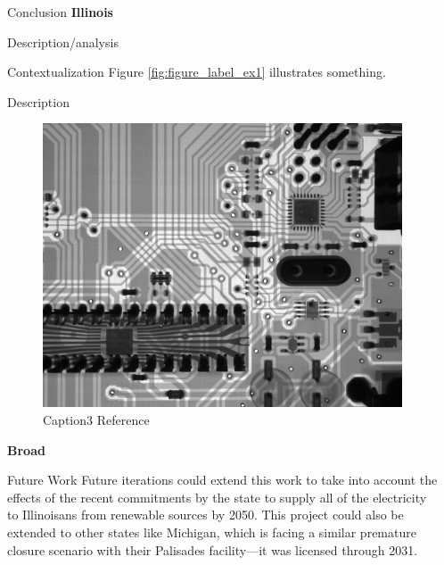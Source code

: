 \documentclass[final]{beamer}
\newlength{\sepwid}
\newlength{\onecolwid}
\newlength{\threecolwid}
\begin{document}
\begin{frame}[t]
\begin{columns}[t,totalwidth=\threecolwid]
\begin{column}{\sepwid}\end{column} %

\begin{column}{\onecolwid} %

\begin{block}{Conclusion}
\textbf{Illinois}
\vspace{0.7em}

Description/analysis
 
Contextualization
Figure \ref{fig:figure_label_ex1} illustrates something.

Description

\begin{figure}
	\label{fig:figure_label_ex3}
	\includegraphics[width=0.9\linewidth]{graphic_name3}
	\caption{Caption3 Reference \cite{call_tag_article}}
\end{figure}

\vspace{0.7em}
\textbf{Broad}
\vspace{0.7em}



\end{block}

\begin{alertblock}{Future Work }
	Future iterations could extend this work to take into account the effects of the recent commitments by the state to supply all of the electricity to Illinoisans from renewable sources by 2050.
	This project could also be extended to other states like Michigan, which is facing a similar premature closure scenario with their Palisades facility---it was licensed through 2031.


\end{alertblock}
\end{column}
\end{columns}
\end{frame}
\end{document}
